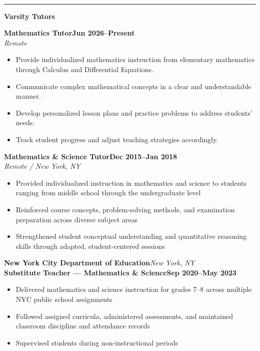 \documentclass[a4paper, 11pt]{article}
\newcommand{\cvsection}[2]{%
  \vspace{14pt}%
  \noindent#1\enspace{\large\bfseries\MakeUppercase{#2}}\\[-3pt]%
  \rule{\linewidth}{1pt}%
  \vspace{5pt}\par\noindent%
}
\newcommand{\entryvspace}{\vspace{9pt}}
\newcommand{\subvspace}{\vspace{6pt}}
\newcommand{\workplace}[1]{%
  \noindent\textbf{#1}\par\vspace{2pt}%
}
\newcommand{\workrole}[3]{%
  \noindent\hspace*{1em}\textbf{#1}\hfill\textbf{#2}\\
  \hspace*{1em}\textit{#3}\par
}
\newcommand{\singlework}[4]{%
  \noindent\textbf{#1}\hfill\textit{#2}\\
  \noindent\hspace*{1em}\textbf{#3}\hfill\textbf{#4}\par
}
\begin{document}
\cvsection{\faChalkboardTeacher}{Teaching Experience}

\begin{minipage}{\linewidth}
\workplace{Varsity Tutors}
\workrole{Mathematics Tutor}{Jun 2026--Present}{Remote}
\begin{itemize}
  \item Provide individualized mathematics instruction from elementary mathematics
          through Calculus and Differential Equations.
  \item Communicate complex mathematical concepts in a clear and understandable manner.
  \item Develop personalized lesson plans and practice problems to address students' needs.
  \item Track student progress and adjust teaching strategies accordingly.
\end{itemize}
\subvspace
\workrole{Mathematics \& Science Tutor}{Dec 2015--Jan 2018}{Remote / New York, NY}
\begin{itemize}
  \item Provided individualized instruction in mathematics and science to students
        ranging from middle school through the undergraduate level
  \item Reinforced course concepts, problem-solving methods, and examination
        preparation across diverse subject areas
  \item Strengthened student conceptual understanding and quantitative reasoning
        skills through adapted, student-centered sessions
\end{itemize}
\end{minipage}

\entryvspace

\singlework{New York City Department of Education}{New York, NY}%
  {Substitute Teacher --- Mathematics \& Science}{Sep 2020--May 2023}
\begin{itemize}
  \item Delivered mathematics and science instruction for grades 7--8 across multiple
        NYC public school assignments
  \item Followed assigned curricula, administered assessments, and maintained
        classroom discipline and attendance records
  \item Supervised students during non-instructional periods
\end{itemize}
\end{document}
